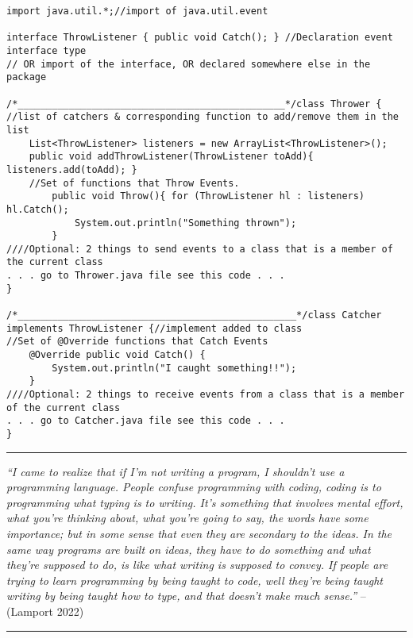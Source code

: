 \begin{verbatim}
import java.util.*;//import of java.util.event

interface ThrowListener { public void Catch(); } //Declaration event interface type
// OR import of the interface, OR declared somewhere else in the package

/*_______________________________________________*/class Thrower {
//list of catchers & corresponding function to add/remove them in the list
    List<ThrowListener> listeners = new ArrayList<ThrowListener>();
    public void addThrowListener(ThrowListener toAdd){ listeners.add(toAdd); }
    //Set of functions that Throw Events.
        public void Throw(){ for (ThrowListener hl : listeners) hl.Catch();
            System.out.println("Something thrown");
        }
////Optional: 2 things to send events to a class that is a member of the current class
. . . go to Thrower.java file see this code . . .
}

/*_________________________________________________*/class Catcher
implements ThrowListener {//implement added to class
//Set of @Override functions that Catch Events
    @Override public void Catch() {
        System.out.println("I caught something!!");
    }
////Optional: 2 things to receive events from a class that is a member of the current class
. . . go to Catcher.java file see this code . . .
}
\end{verbatim}

\begin{center}\rule{0.5\linewidth}{0.5pt}\end{center}

\emph{``I came to realize that if I'm not writing a program, I shouldn't
use a programming language. People confuse programming with coding,
coding is to programming what typing is to writing. It's something that
involves mental effort, what you're thinking about, what you're going to
say, the words have some importance; but in some sense that even they
are secondary to the ideas. In the same way programs are built on ideas,
they have to do something and what they're supposed to do, is like what
writing is supposed to convey. If people are trying to learn programming
by being taught to code, well they're being taught writing by being
taught how to type, and that doesn't make much sense.''} --(Lamport
2022)

\begin{center}\rule{0.5\linewidth}{0.5pt}\end{center}

